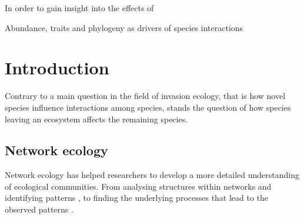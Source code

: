 \documentclass[12pt,a4paper]{article}
\begin{document}
In order to gain insight into the effects of

Abundance, traits and phylogeny as drivers of species interactions
\newpage%
%
%
\section{Introduction}





Contrary to a main question in the field of invasion ecology, that is how novel species influence interactions among species, stands the question of how species leaving an ecosystem affects the remaining species. 


%
\subsection{Network ecology}
Network ecology has helped researchers to develop a more detailed understanding of ecological communities. From analysing structures within networks and identifying patterns \parencite{Jordano1987, Dunne2002}, %
to finding the underlying processes that lead to the observed patterns \parencite{Rezende2007, Vazquez2009, Thebault2010}.

\end{document}
